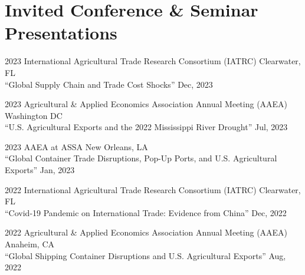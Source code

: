 \documentclass[10.5 pt,letterpaper]{article}
\renewenvironment{itemize}{
	\begin{list}{}{
			\setlength{\leftmargin}{1.5em}
		}
	}{
	\end{list}
}
\begin{document}
	
	
	
	
	\section*{\textbf{Invited Conference \& Seminar Presentations}}
	
	
	
	\begin{itemize}
		
			\item[-]	2023 International Agricultural Trade Research Consortium (IATRC)  \hfill Clearwater, FL\vspace{0.15cm} \\
``Global Supply Chain and Trade Cost Shocks'' \hfill   Dec, 2023


		\item[-]	2023 Agricultural \& Applied Economics  Association Annual Meeting (AAEA)   \hfill   Washington DC\vspace{0.15cm} \\
``U.S. Agricultural Exports and the 2022 Mississippi River Drought''  \hfill Jul, 2023



   \item[-]  2023 AAEA at ASSA    \hfill   New Orleans, LA\vspace{0.15cm} \\
	``Global Container Trade Disruptions, Pop-Up Ports, and U.S. Agricultural Exports''  \hfill Jan, 2023 

 

			\item[-]	2022  International Agricultural Trade Research Consortium (IATRC)   \hfill Clearwater, FL\vspace{0.15cm} \\
	``Covid-19 Pandemic on International Trade: Evidence from China'' \hfill   Dec, 2022
	
	
		\item[-]	2022  Agricultural \& Applied Economics  Association Annual Meeting (AAEA)   \hfill   Anaheim, CA\vspace{0.15cm} \\
			``Global Shipping Container Disruptions and U.S. Agricultural Exports''   \hfill   Aug, 2022
			

\end{itemize}
\end{document}
